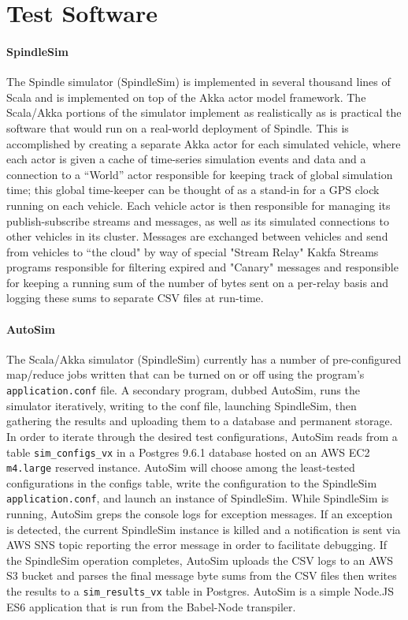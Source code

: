 \documentclass{thesis}
\begin{document}
\section{Test Software}
    \paragraph{SpindleSim}
        The Spindle simulator (SpindleSim) is implemented in several thousand lines of Scala %
        and is implemented on top of the Akka %
        actor model framework. The Scala/Akka portions of the simulator implement as realistically
        as is practical the software that would run on a real-world deployment of Spindle. This is
        accomplished by creating a separate Akka actor for each simulated vehicle, where each actor
        is given a cache of time-series simulation events and data and a connection to a ``World''
        actor responsible for keeping track of global simulation time; this global time-keeper 
        can be thought of as a stand-in for a GPS clock running on each vehicle. Each vehicle
        actor is then responsible for managing its publish-subscribe streams and messages, as well
        as its simulated connections to other vehicles in its cluster. Messages are exchanged between
        vehicles and send from vehicles to ``the cloud" by way of special "Stream Relay" Kakfa Streams
        programs responsible for filtering expired and "Canary" messages %
        and responsible for keeping a running sum of the number of bytes sent on a per-relay basis and logging
        these sums to separate CSV files at run-time.
    \paragraph{AutoSim}
        The Scala/Akka simulator (SpindleSim) currently has a number of pre-configured map/reduce jobs written
        that can be turned on or off using the program's \verb|application.conf| file. A secondary
        program, dubbed AutoSim, runs the simulator iteratively, writing to the conf file, launching
        SpindleSim, then gathering the results and uploading them to a database and permanent storage.
        In order to iterate through the desired test configurations, AutoSim reads from a table \verb|sim_configs_vx| in a 
        Postgres 9.6.1 database hosted on an AWS EC2 \verb|m4.large| reserved instance.
        AutoSim will choose among the least-tested configurations in the configs table, write the configuration to
        the SpindleSim \verb|application.conf|, and launch an instance of SpindleSim. While SpindleSim is running, AutoSim
        greps the console logs for exception messages. If an exception is detected, the current SpindleSim instance is killed
        and a notification is sent via AWS SNS topic reporting the error message in order to facilitate debugging. If the SpindleSim
        operation completes, AutoSim uploads the CSV logs to an AWS S3 bucket and parses the final message byte sums from the CSV
        files then writes the results to a \verb|sim_results_vx| table in Postgres. AutoSim is a simple Node.JS ES6 application
        that is run from the Babel-Node %
        transpiler.
\end{document}
